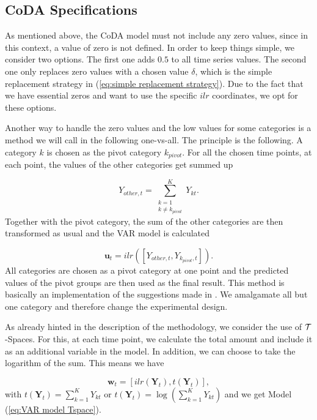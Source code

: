 \subsection{CoDA Specifications}
\label{sec: Coda Specifications}

As mentioned above, the CoDA model must not include any zero values, since in this context, a value of zero is not defined. In order to keep things simple, we consider two options. The first one adds $0.5$ to all time series values. The second one only replaces zero values with a chosen value $\delta$, which is the simple replacement strategy in (\ref{eq:simple replacement strategy}). Due to the fact that we have essential zeros and want to use the specific $ilr$ coordinates, we opt for these options. 

Another way to handle the zero values and the low values for some categories is a method we will call in the following one-vs-all. The principle is the following. A category $k$ is chosen as the pivot category $k_{pivot}$. For all the chosen time points, at each point, the values of the other categories get summed up

\begin{equation}
Y_{other,t} = \sum_{\substack{k=1 \\ k \neq k_{pivot}}}^K Y_{kt}.
\label{eq:one vs all}
\end{equation}
%
Together with the pivot category, the sum of the other categories are then transformed as usual and the VAR model is calculated 

\begin{equation}
\bm{u}_t = ilr([Y_{other,t}, Y_{k_{pivot},t}]).
\label{eq:one vs all ilr}
\end{equation}
%
All categories are chosen as a pivot category at one point and the predicted values of the pivot groups are then used as the final result. This method is basically an implementation of the suggestions made in \textcite{Aitchison:2003}. We amalgamate all but one category and therefore change the experimental design. 

As already hinted in the description of the methodology, we consider the use of $\mathcal{T}$-Spaces. For this, at each time point, we calculate the total amount and include it as an additional variable in the model. In addition, we can choose to take the logarithm of the sum. This means we have 

\begin{equation}
\bm{w}_t = [ilr(\bm{Y}_t),t(\bm{Y}_t)],
\label{eq:Tspace u}
\end{equation}
%
with $t(\bm{Y}_t) = \sum_{k=1}^K Y_{kt}$ or $t(\bm{Y}_t) = \log\left(\sum_{k=1}^K Y_{kt}\right)$ and we get Model (\ref{eq:VAR model Tspace}).

